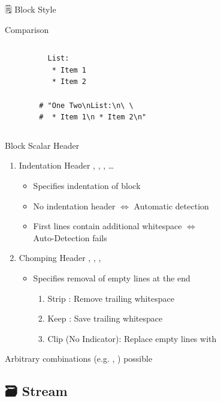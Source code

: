 \documentclass{beamer}
\newcommand{\code}[1]{
  \codebox{\texttt|#1|}
}
\begin{document}
\begin{frame}{🗒 Block Style}
\begin{block}{Comparison}
\begin{columns}
\begin{verbatim}
          List:
           * Item 1
           * Item 2

        # "One Two\nList:\n\ \
        #  * Item 1\n * Item 2\n"
      \end{verbatim}

    \end{columns}
  \end{block}
  \hspace{0pt}
  \vfill

  \newpage
  \begin{block}{Block Scalar Header}
    \begin{enumerate}
      \item Indentation Header , \code{>2}, \code{>5}, …
      \begin{itemize}
        \item Specifies indentation of block
        \item No indentation header $⇔$ Automatic detection
        \item First lines contain additional whitespace $⇔$ \\
              \alert{Auto-Detection fails}
      \end{itemize}
      \item Chomping Header \codebox{\texttt{|-}}, \codebox{\texttt{|+}}, \code{>-}, \code{>+}
      \begin{itemize}
        \item Specifies removal of empty lines \alert{at the end}
        \begin{enumerate}
          \item Strip \code{-}: Remove trailing whitespace
          \item Keep \code{+}: Save trailing whitespace
          \item Clip (No Indicator): Replace empty lines with \code{\n}
        \end{enumerate}
      \end{itemize}
    \end{enumerate}
    Arbitrary combinations (e.g. , \code{>4+}) possible
  \end{block}

\end{frame}

\subsection{🗃 Stream}
\end{document}
